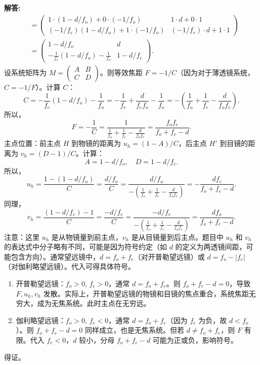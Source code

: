\documentclass[12pt, a4paper, oneside]{ctexart}
\newenvironment{solution}{\par\noindent\textbf{解答:}\quad}{\par}
\begin{document}
\begin{solution}
\begin{align*}
        &= \begin{pmatrix} 1 \cdot (1 - d/f_o) + 0 \cdot (-1/f_o) & 1 \cdot d + 0 \cdot 1 \\ (-1/f_e)(1 - d/f_o) + 1 \cdot (-1/f_o) & (-1/f_e) \cdot d + 1 \cdot 1 \end{pmatrix} \\
        &= \begin{pmatrix} 1 - d/f_o & d \\ -\frac{1}{f_e}(1 - d/f_o) - \frac{1}{f_o} & 1 - d/f_e \end{pmatrix}.
    \end{align*}
    设系统矩阵为 $M = \begin{pmatrix} A & B \\ C & D \end{pmatrix}$。则等效焦距 $F = -1/C$（因为对于薄透镜系统，$C = -1/F$）。计算 $C$：
    \[
    C = -\frac{1}{f_e}(1 - d/f_o) - \frac{1}{f_o} = -\frac{1}{f_e} + \frac{d}{f_e f_o} - \frac{1}{f_o} = -\left( \frac{1}{f_o} + \frac{1}{f_e} - \frac{d}{f_o f_e} \right).
    \]
    所以，
    \[
    F = -\frac{1}{C} = \frac{1}{\frac{1}{f_o} + \frac{1}{f_e} - \frac{d}{f_o f_e}} = \frac{f_o f_e}{f_o + f_e - d}.
    \]
    主点位置：前主点 $H$ 到物镜的距离为 $u_h = (1-A)/C$，后主点 $H'$ 到目镜的距离为 $v_h = (D-1)/C$。计算：
    \[
    A = 1 - d/f_o, \quad D = 1 - d/f_e.
    \]
    所以，
    \[
    u_h = \frac{1 - (1 - d/f_o)}{C} = \frac{d/f_o}{C} = \frac{d/f_o}{-\left( \frac{1}{f_o} + \frac{1}{f_e} - \frac{d}{f_o f_e} \right)} = -\frac{d f_e}{f_o + f_e - d}.
    \]
    同理，
    \[
    v_h = \frac{(1 - d/f_e) - 1}{C} = \frac{-d/f_e}{C} = \frac{-d/f_e}{-\left( \frac{1}{f_o} + \frac{1}{f_e} - \frac{d}{f_o f_e} \right)} = \frac{d f_o}{f_o + f_e - d}.
    \]
    注意：这里 $u_h$ 是从物镜量到前主点，$v_h$ 是从目镜量到后主点。题目中 $u_h$ 和 $v_h$ 的表达式中分子略有不同，可能是因为符号约定（如 $d$ 的定义为两透镜间距，可能包含方向）。通常望远镜中，$d = f_o + f_e$（对开普勒望远镜）或 $d = f_o - |f_e|$（对伽利略望远镜）。代入可得具体符号。

    \begin{enumerate}
        \item 开普勒望远镜：$f_o > 0$, $f_e > 0$，通常 $d = f_o + f_e$。则 $f_o + f_e - d = 0$，导致 $F, u_h, v_h$ 发散。实际上，开普勒望远镜的物镜和目镜的焦点重合，系统焦距无穷大，成为无焦系统。此时主点在无穷远。
        \item 伽利略望远镜：$f_o > 0$, $f_e < 0$，通常 $d = f_o + f_e$（因为 $f_e$ 为负，故 $d < f_o$）。则 $f_o + f_e - d = 0$ 同样成立，也是无焦系统。但若 $d \neq f_o + f_e$，则 $F$ 有限。代入 $f_e<0$，$d$ 较小，分母 $f_o+f_e-d$ 可能为正或负，影响符号。
    \end{enumerate}
    得证。
\end{solution}
\end{document}
